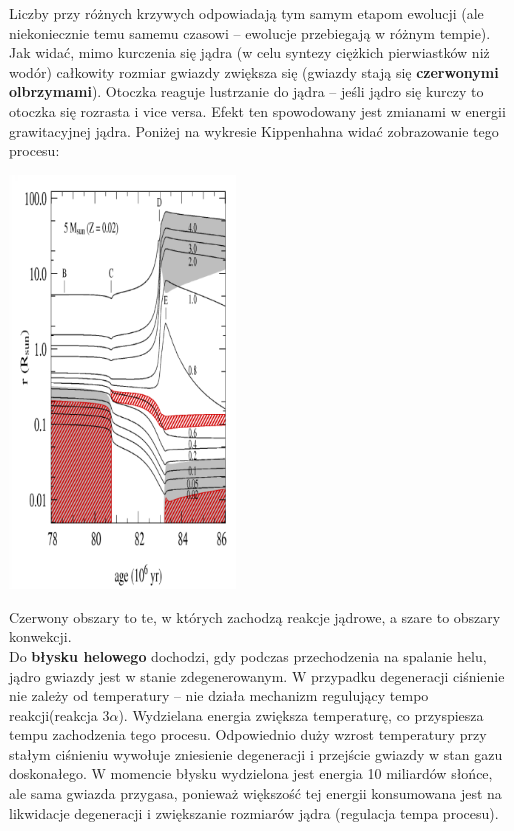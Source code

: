 \documentclass[../index.tex]{subfiles}
\begin{document}
        Liczby przy różnych krzywych odpowiadają tym samym etapom ewolucji (ale niekoniecznie temu samemu czasowi – ewolucje przebiegają w różnym tempie). Jak widać, mimo kurczenia się jądra (w celu syntezy ciężkich pierwiastków niż wodór) całkowity rozmiar gwiazdy zwiększa się (gwiazdy stają się \textbf{czerwonymi olbrzymami}). Otoczka reaguje lustrzanie do jądra – jeśli jądro się kurczy to otoczka się rozrasta i vice versa. Efekt ten spowodowany jest zmianami w energii grawitacyjnej jądra. Poniżej na wykresie Kippenhahna widać zobrazowanie tego procesu:
        \begin{center}
            \includegraphics[width=6cm]{images/ewolucjaGwiazdKippenhahn.png}
        \end{center}
        Czerwony obszary to te, w których zachodzą reakcje jądrowe, a szare to obszary konwekcji.\\
        Do \textbf{błysku helowego} dochodzi, gdy podczas przechodzenia na spalanie helu, jądro gwiazdy jest w stanie zdegenerowanym. W przypadku degeneracji ciśnienie nie zależy od temperatury – nie działa mechanizm regulujący tempo reakcji(reakcja \(3\alpha\)). Wydzielana energia zwiększa temperaturę, co przyspiesza tempu zachodzenia tego procesu. Odpowiednio duży wzrost temperatury przy stałym ciśnieniu wywołuje zniesienie degeneracji i przejście gwiazdy w stan gazu doskonałego. W momencie błysku wydzielona jest energia 10 miliardów słońce, ale sama gwiazda przygasa, ponieważ większość tej energii konsumowana jest na likwidacje degeneracji i zwiększanie rozmiarów jądra (regulacja tempa procesu).\\
\end{document}
